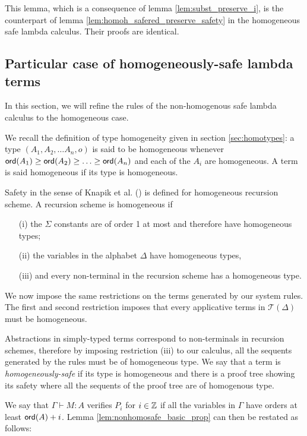This lemma, which is a consequence of lemma \ref{lem:subst_preserve_i}, is the counterpart of lemma \ref{lem:homoh_safered_preserve_safety} in the homogeneous safe lambda calculus.
Their proofs are identical.


\subsection{Particular case of homogeneously-safe lambda terms}

In this section, we will refine the rules of the non-homogenous safe lambda calculus to the homogeneous case.

We recall the definition of type homogeneity given in section \ref{sec:homotypes}:
a type $(A_1, A_2, \ldots A_n, o)$ is said to be homogeneous whenever ${\sf ord}(A_1) \geq {\sf ord}(A_2) \geq
\ldots \geq  {\sf ord}(A_n)$ and each of the $A_i$ are homogeneous. A term is said homogeneous if its type is homogeneous.

Safety in the sense of Knapik et al. (\cite{KNU02}) is defined for homogeneous recursion scheme.
A recursion scheme is homogeneous if
\begin{itemize}
    \item[(i)] the $\Sigma$ constants are of order 1 at most and therefore have homogeneous types;
    \item[(ii)] the variables in the alphabet $\Delta$ have homogeneous types,
    \item[(iii)] and every non-terminal in the recursion scheme has a homogeneous type.
\end{itemize}

We now impose the same restrictions on the terms generated by our system rules.
The first and second restriction imposes that every applicative terms in $\mathcal{T}(\Delta)$ must be homogeneous.

Abstractions in simply-typed terms correspond to non-terminals in recursion schemes,
therefore by imposing restriction (iii) to our calculus, all the sequents generated by the rules must be of homogeneous type.
We say that a term is \emph{homogeneously-safe} if its type is homogeneous
and there is a proof tree showing its safety where all the sequents
of the proof tree are of homogenous type.

We say that $\Gamma \vdash M : A$ verifies $P_i$ for $i \in \mathbb{Z}$ if all the
variables in $\Gamma$ have orders at least ${\sf ord}(A)+i$.
Lemma \ref{lem:nonhomosafe_basic_prop} can then be restated as follows:

